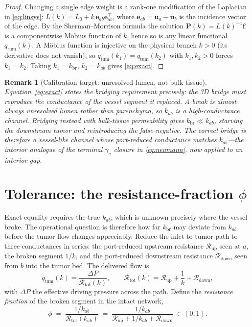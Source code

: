\documentclass[11pt]{article}
\newtheorem{remark}{Remark}
\newcommand{\Rup}{\mathcal{R}_{\mathrm{up}}}
\newcommand{\Rdown}{\mathcal{R}_{\mathrm{down}}}
\newcommand{\Rtot}{\mathcal{R}_{\mathrm{tot}}}
\newcommand{\kbr}{k_{\mathrm{br}}}
\newcommand{\qtum}{q_{\mathrm{tum}}}
\begin{document}
\begin{proof}
Changing a single edge weight is a rank-one modification of the Laplacian in
\eqref{eq:linsys}: $L(k) = L_0 + k\,\bm{e}_{ab}\bm{e}_{ab}^{\!\top}$, where
$\bm{e}_{ab} = \bm{u}_a - \bm{u}_b$ is the incidence vector of the edge. By the
Sherman--Morrison formula the solution $\bm{P}(k) = L(k)^{-1}\bm{f}$ is a
componentwise M\"obius function of $k$, hence so is any linear functional
$\qtum(k)$. A M\"obius function is injective on the physical branch $k>0$
(its derivative does not vanish), so $\qtum(k_1)=\qtum(k_2)$ with $k_1,k_2>0$
forces $k_1=k_2$. Taking $k_1=\kbr$, $k_2=k_{ab}$ gives \eqref{eq:exact}.
\end{proof}

\begin{remark}[Calibration target: unresolved lumen, not bulk tissue]
\label{rem:lumen}
Equation~\eqref{eq:exact} states the bridging requirement precisely: the 3D bridge
must reproduce the conductance of the \emph{vessel segment it replaced}. A break is
almost always unresolved lumen rather than parenchyma, so $k_{ab}$ is a
high-conductance channel. Bridging instead with bulk-tissue permeability gives
$\kbr \ll k_{ab}$, starving the downstream tumor and reintroducing the
false-negative. The correct bridge is therefore a vessel-like channel whose
port-reduced conductance matches $k_{ab}$---the interior analogue of the terminal
$\gamma_a$ closure in \eqref{eq:neumann}, now applied to an \emph{interior} gap.
\end{remark}

\section{Tolerance: the resistance-fraction \texorpdfstring{$\phi$}{phi}}
\label{sec:tolerance}

Exact equality requires the true $k_{ab}$, which is unknown precisely where the
vessel broke. The operational question is therefore how far $\kbr$ may deviate from
$k_{ab}$ before the tumor flow changes appreciably. Reduce the inlet-to-tumor path
to three conductances in series: the port-reduced upstream resistance $\Rup$ seen
at $a$, the broken segment $1/k$, and the port-reduced downstream resistance
$\Rdown$ seen from $b$ into the tumor bed. The delivered flow is
\begin{equation}
\qtum(k) = \frac{\Delta P}{\Rtot(k)},
\qquad
\Rtot(k) = \Rup + \frac{1}{k} + \Rdown,
\label{eq:series}
\end{equation}
with $\Delta P$ the effective driving pressure across the path. Define the
\emph{resistance fraction} of the broken segment in the intact network,
\begin{equation}
\boxed{\;
\phi \;=\; \frac{1/k_{ab}}{\Rtot(k_{ab})}
\;=\; \frac{1/k_{ab}}{\Rup + 1/k_{ab} + \Rdown}
\;\in (0,1).
\;}
\label{eq:phi}
\end{equation}
\end{document}
